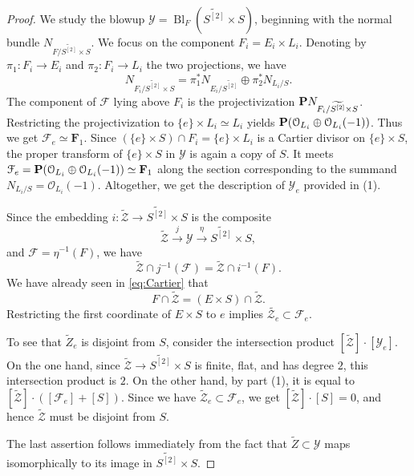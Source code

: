 \documentclass[11pt,reqno, letterpaper]{amsart}
\DeclareMathOperator{\Bl}{Bl}
\renewcommand{\to}{{\longrightarrow}}
\numberwithin{equation}{section}
\renewcommand{\O}{\mathcal O}
\newcommand{\F}{\mathbf F}
\newcommand{\td}{\widetilde}
\begin{document}
\begin{proof}
  We study the blowup $\mathcal{Y} = \Bl_{F} \left( \td{S^{[2]}} \times S
  \right)$, beginning with the normal bundle $N_{F/ \td{S^{[2]}} \times S }$.
  We focus on the component $F_{i} = E_{i} \times L_{i}$.
  Denoting by ${\pi}_1 \colon F_i \to E_i$ and ${\pi}_2 \colon F_i \to L_i$ the two projections, we have
  \[N_{F_{i}/ \td{S^{[2]}} \times S } = {\pi}_{1}^{*}
    N_{E_{i}/\td{S^{[2]}}} \oplus {\pi}_{2}^{*}N_{L_{i}/S}.\]
  The component of $\mathcal{F}$ lying above $F_{i}$ is the
  projectivization $\P N_{F_{i}/ \td{S^{[2]}} \times S }$.
  Restricting the projectivization to $\{e\} \times L_{i} \simeq L_i$ yields
  $\P (\O_{L_{i}} \oplus \O_{L_{i}}(-1))$.
  Thus we get  $\mathcal{F}_{e} \simeq \F_{1}$.
  Since $(\{e\} \times S) \cap F_{i} = \{e\} \times L_{i}$ is a Cartier
  divisor on $\{e\} \times S$, the proper transform of $\{e\} \times S$ in
  $\mathcal{Y}$ is again a copy of $S$.
  It meets
  $\mathcal{F}_{e} = \P (\O_{L_{i}} \oplus \O_{L_{i}}(-1)) \simeq
  \F_{1}$ along the section corresponding to the summand
  $N_{L_{i}/S} = \O_{L_{i}}(-1)$.
  Altogether, we get the description of $\mathcal{Y}_{e}$ provided in (1).

  Since the embedding $i \colon \widetilde {\mathcal Z} \to \widetilde{S^{[2]}} \times S$ is the composite
  \[\widetilde {\mathcal Z} \xrightarrow{j} \mathcal Y \xrightarrow{\eta} \widetilde{S^{[2]}} \times S,\]
  and $\mathcal F = \eta^{-1}(F)$, we have
  \[ \widetilde {\mathcal Z} \cap j^{-1}\left(\mathcal F\right) = \widetilde {\mathcal Z} \cap i^{-1}(F).\]
  We have already seen in \eqref{eq:Cartier} that
  \[F \cap \td{\mathcal{Z}} = (E \times S)\cap \td{\mathcal{Z}}.\]
  Restricting the first coordinate of $E \times S$ to $e$ implies
  $\td{\mathcal{Z}_{e}} \subset \mathcal{F}_{e}$.

  To see that $\widetilde Z_e$ is disjoint from $S$, consider
the intersection product
$[\td{\mathcal{Z}}] \cdot [\mathcal{Y}_{e}]$.  On the one hand, since
$\td{\mathcal{Z}} \to \td{S^{[2]}} \times S$ is finite,
flat, and has degree $2$, this intersection product is $2$.  On the
other hand, by part (1), it is equal to
$[\td{\mathcal{Z}}] \cdot ([\mathcal{F}_{e}]+ [S])$.
Since we have
$\td{\mathcal{Z}}_{e} \subset \mathcal{F}_{e}$, we get
$[\td{\mathcal{Z}}] \cdot [S] = 0$, and hence $\td{\mathcal Z}$ must be disjoint from $S$.

The last assertion follows immediately from the fact that $\widetilde Z \subset \mathcal Y$ maps isomorphically to its image in $\widetilde{S^{[2]}} \times S$.
\end{proof}
\end{document}
